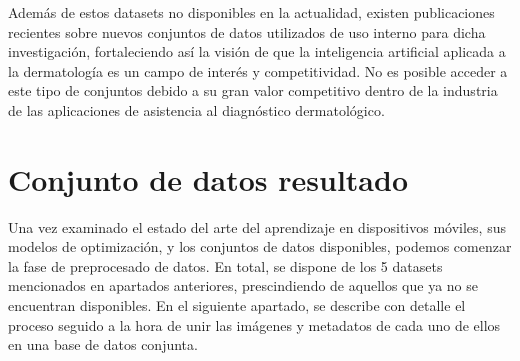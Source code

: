 Además de estos datasets no disponibles en la actualidad, existen publicaciones recientes sobre nuevos conjuntos de datos utilizados de uso interno para dicha investigación, fortaleciendo así la visión de que la inteligencia artificial aplicada a la dermatología es un campo de interés y competitividad. No es posible acceder a este tipo de conjuntos debido a su gran valor competitivo dentro de la industria  de las aplicaciones de asistencia al diagnóstico dermatológico.

\section{Conjunto de datos resultado}

Una vez examinado el estado del arte del aprendizaje en dispositivos móviles, sus modelos de optimización, y los conjuntos de datos disponibles, podemos comenzar la fase de preprocesado de datos. En total, se dispone de los 5 datasets mencionados en apartados anteriores, prescindiendo de aquellos que ya no se encuentran disponibles. En el siguiente apartado, se describe con detalle el proceso seguido a la hora de unir las imágenes y metadatos de cada uno de ellos en una base de datos conjunta.